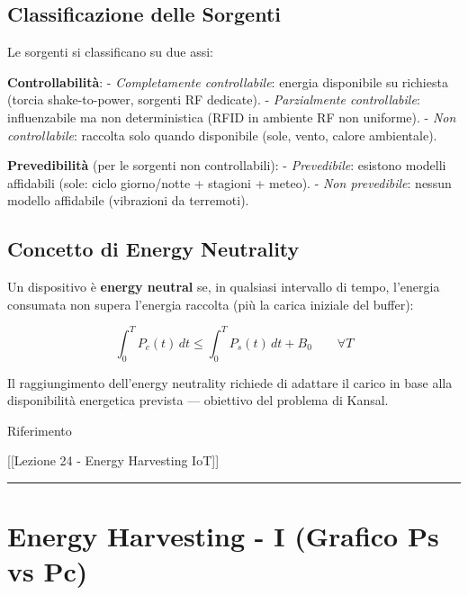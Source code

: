 \documentclass[
  italian,
  openany]{book}
\begin{document}
\subsection{Classificazione delle
Sorgenti}\label{classificazione-delle-sorgenti}

Le sorgenti si classificano su due assi:

\textbf{Controllabilità}: - \emph{Completamente controllabile}: energia
disponibile su richiesta (torcia shake-to-power, sorgenti RF dedicate).
- \emph{Parzialmente controllabile}: influenzabile ma non deterministica
(RFID in ambiente RF non uniforme). - \emph{Non controllabile}: raccolta
solo quando disponibile (sole, vento, calore ambientale).

\textbf{Prevedibilità} (per le sorgenti non controllabili): -
\emph{Prevedibile}: esistono modelli affidabili (sole: ciclo
giorno/notte + stagioni + meteo). - \emph{Non prevedibile}: nessun
modello affidabile (vibrazioni da terremoti).

\subsection{Concetto di Energy
Neutrality}\label{concetto-di-energy-neutrality}

Un dispositivo è \textbf{energy neutral} se, in qualsiasi intervallo di
tempo, l'energia consumata non supera l'energia raccolta (più la carica
iniziale del buffer):

\[\int_0^T P_c(t)\,dt \leq \int_0^T P_s(t)\,dt + B_0 \qquad \forall T\]

Il raggiungimento dell'energy neutrality richiede di adattare il carico
in base alla disponibilità energetica prevista --- obiettivo del
problema di Kansal.

\begin{calloutnote}{Riferimento}

{[}{[}Lezione 24 - Energy Harvesting IoT{]}{]}

\end{calloutnote}

\begin{center}\rule{0.5\linewidth}{0.5pt}\end{center}

\section{Energy Harvesting - I (Grafico Ps vs
Pc)}\label{energy-harvesting---i-grafico-ps-vs-pc}
\end{document}
